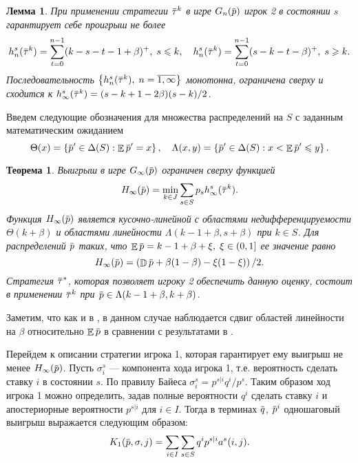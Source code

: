 \documentclass[12pt, draft]{extarticle}
\newtheorem{lemma}{Лемма}
\newtheorem{theorem}{Теорема}
\newcommand{\overbar}[1]%
{\mkern 1.5mu\overline{\mkern-1.3mu#1\mkern-1.3mu}\mkern 1.3mu}
\newcommand{\p}{\ensuremath{\overbar{p}}}
\newcommand{\q}{\ensuremath{\overbar{q}}}
\DeclareMathOperator{\E}{\mathbb{E}}
\DeclareMathOperator{\D}{\mathbb{D}}
\newcommand{\G}[1][n]{\ensuremath{G_{#1}}}
\newcommand{\K}[1][n]{\ensuremath{K_{#1}}}
\newcommand{\High}[1][\ensuremath{\infty}]{\ensuremath{H_{#1}}}
\newcommand{\tauv}{\ensuremath{\overbar{\tau}}}
\begin{document}
\begin{lemma}
  \label{upper-bound:lemma:vector-payoffs}
  При применении стратегии $\tauv^k$ в игре $\G(\p)$ игрок 2 в состоянии $s$
  гарантирует себе проигрыш не более
  \begin{gather*}
    h^s_n(\tauv^k) = \sum_{t=0}^{n-1} (k-s-t-1+\beta)^+, \; s \leqslant k, \quad
    h^s_n(\tauv^k) = \sum_{t=0}^{n-1} (s-k-t-\beta)^+, \; s \geqslant k.
  \end{gather*}
  Последовательность $\left\{ h^s_n(\tauv^k), \; n = \overline{1, \infty}
  \right\}$ монотонна, ограничена сверху и сходится к %
  $h^s_\infty(\tauv^k) = (s - k + 1 - 2\beta)(s-k)/2$.
\end{lemma}

Введем следующие обозначения для множества распределений на $S$ с заданным
математическим ожиданием
\begin{equation*}
  \Theta(x) = \left\{ \p' \in \Delta(S): \E \p' = x \right\}, \quad
  \Lambda(x, y) = \left\{ \p' \in \Delta(S): x < \E \p' \leqslant y \right\}.
\end{equation*}

\begin{theorem}
  \label{upper-bound:theorem}
  Выигрыш в игре $\G[\infty](\p)$ ограничен сверху функцией
  \begin{equation*}
    \High(\p) = \min_{k \in J} \sum_{s \in S} p_s  h^s_\infty(\tauv^k).
  \end{equation*}
  Функция $\High(\p)$ является кусочно-линейной с областями недифференцируемости
  $\Theta(k+\beta)$ и областями линейности $\Lambda(k - 1 + \beta, s + \beta)$
  при $k \in S$. Для распределений $\p$ таких, что $\E \p = k - 1 + \beta + \xi,
  \; \xi \in (0, 1]$ ее значение равно
  \begin{equation*}
    \High(\p) = \left( \D \p + \beta(1-\beta) - \xi(1-\xi) \right)/2.
  \end{equation*}
  Стратегия $\tauv^*$, которая позволяет игроку 2 обеспечить данную оценку,
  состоит в применении $\tauv^k$ при $\p \in \Lambda(k - 1 + \beta, k + \beta)$.
\end{theorem}
Заметим, что как и в \cite{bib:pyanykh16}, в данном случае наблюдается сдвиг
областей линейности на $\beta$ относительно $\E \p$ в сравнении с результатами в
\cite{bib:domansky11}.

Перейдем к описании стратегии игрока 1, которая гарантирует ему выигрыш не менее
$\High(\p)$. Пусть $\sigma^s_i$ --- компонента хода игрока 1, т.е. вероятность
сделать ставку $i$ в состоянии $s$. По правилу Байеса $\sigma^s_i = p^{s|i} q^i
/ p^s$. Таким образом ход игрока 1 можно определить, задав полные вероятности
$q^i$ сделать ставку $i$ и апостериорные вероятности $p^{s|i}$ для $i \in I$.
Тогда в терминах $\q$, $\p^i$ одношаговый выигрыш выражается следующим образом:
\begin{equation*}
  \K[1](\p, \sigma, j) = \sum_{i \in I} \sum_{s \in S} q^i p^{s|i} a^s(i, j).
\end{equation*}
\end{document}
